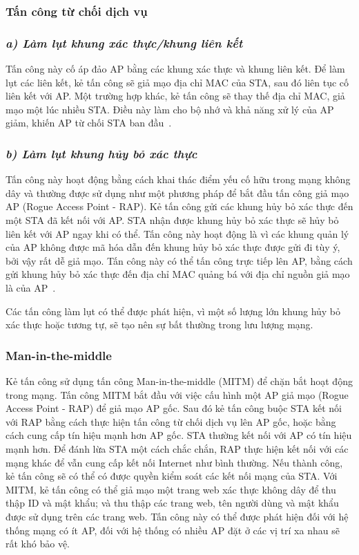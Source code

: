 \subsubsection{Tấn công từ chối dịch vụ}
\subsubsection*{\textit{a) Làm lụt khung xác thực/khung liên kết}}
Tấn công này cố áp đảo AP bằng các khung xác thực và khung liên kết. Để làm lụt các liên kết, kẻ tấn công sẽ giả mạo địa chỉ MAC của STA, sau đó liên tục cố liên kết với AP. Một trường hợp khác, kẻ tấn công sẽ thay thế địa chỉ MAC, giả mạo một lúc nhiều STA. Điều này làm cho bộ nhớ và khả năng xử lý của AP giảm, khiến AP từ chối STA ban đầu~\cite{scott2011known}.
	
\subsubsection*{\textit{b) Làm lụt khung hủy bỏ xác thực}}
Tấn công này hoạt động bằng cách khai thác điểm yếu cố hữu trong mạng không dây và thường được sử dụng như một phương pháp để bắt đầu tấn công giả mạo AP (Rogue Access Point - RAP). Kẻ tấn công gửi các khung hủy bỏ xác thực đến một STA đã kết nối với AP. STA nhận được khung hủy bỏ xác thực sẽ hủy bỏ liên kết với AP ngay khi có thể. Tấn công này hoạt động là vì các khung quản lý của AP không được mã hóa dẫn đến khung hủy bỏ xác thực được gửi đi tùy ý, bởi vậy rất dễ giả mạo. Tấn công này có thể tấn công trực tiếp lên AP, bằng cách gửi khung hủy bỏ xác thực đến địa chỉ MAC quảng bá với địa chỉ nguồn giả mạo là của AP~\cite{scott2011known}.

Các tấn công làm lụt có thể được phát hiện, vì một số lượng lớn khung hủy bỏ xác thực hoặc tương tự, sẽ tạo nên sự bất thường trong lưu lượng mạng.

\subsubsection{Man-in-the-middle}
Kẻ tấn công sử dụng tấn công Man-in-the-middle (MITM) để chặn bắt hoạt động trong mạng. Tấn công MITM bắt đầu với việc cấu hình một AP giả mạo (Rogue Access Point - RAP) để giả mạo AP gốc. Sau đó kẻ tấn công buộc STA kết nối với RAP bằng cách thực hiện tấn công từ chối dịch vụ lên AP gốc, hoặc bằng cách cung cấp tín hiệu mạnh hơn AP gốc. STA thường kết nối với AP có tín hiệu mạnh hơn. Để đánh lừa STA một cách chắc chắn, RAP thực hiện kết nối với các mạng khác để vẫn cung cấp kết nối Internet như bình thường. Nếu thành công, kẻ tấn công sẽ có thể có được quyền kiểm soát các kết nối mạng của STA. Với MITM, kẻ tấn công có thể giả mạo một trang web xác thực không dây để thu thập ID và mật khẩu; và thu thập các trang web, tên người dùng và mật khẩu được sử dụng trên các trang web. Tấn công này có thể được phát hiện đối với hệ thống mạng có ít AP, đối với hệ thống có nhiều AP đặt ở các vị trí xa nhau sẽ rất khó bảo vệ.

